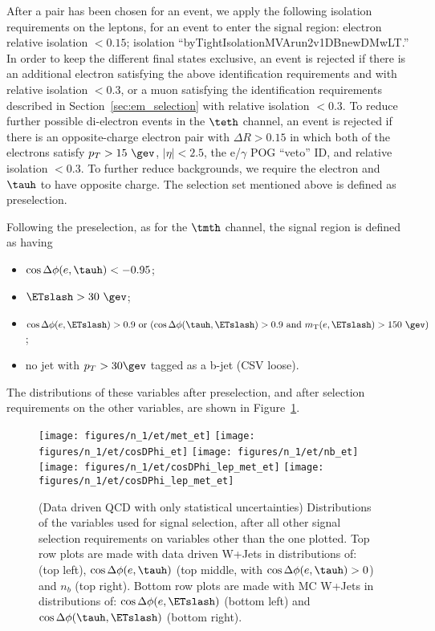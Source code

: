 After a pair has been chosen for an event, we apply the following
isolation requirements on the leptons, for an event to enter the
signal region: electron relative isolation $<0.15$; \tauh isolation
``byTightIsolationMVArun2v1DBnewDMwLT.''  In order to keep the
different final states exclusive, an event is rejected if there is an
additional electron satisfying the above identification requirements
and with relative isolation $<0.3$, or a muon satisfying the
identification requirements described in
Section~\ref{sec:em_selection} with relative isolation $<0.3$.  To
reduce further possible di-electron events in the $\teth$ channel, an
event is rejected if there is an opposite-charge electron pair with
$\Delta R > 0.15$ in which both of the electrons satisfy $p_T >
15~\gev$, $\vert \eta \vert < 2.5$, the e/$\gamma$ POG ``veto'' ID,
and relative isolation $<0.3$. To further reduce backgrounds, we require 
the electron and $\tauh$ to have opposite charge. The selection set 
mentioned above is defined as preselection.

Following the preselection, as for the $\tmth$ channel, the signal 
region is defined as having
\begin{itemize}
  \item $\cos{\Delta \phi (e,\tauh)}<-0.95$;
  \item $\ETslash>30~\gev$;
  \item $\cos{\Delta \phi (e,\ETslash)} > 0.9~\text{or}~(\cos{\Delta \phi (\tauh,\ETslash)} > 0.9~\text{and}~m_{\text{T}}(e,\ETslash) > 150~\gev)$;
  \item no jet with $p_T>30\gev$ tagged as a b-jet (CSV loose).
\end{itemize}

The distributions of these variables after preselection, and after
selection requirements on the other variables, are shown in
Figure~\ref{fig:et_nm1_distributions}.
\begin{figure}\centering
  \texttt{[image: figures/n\_1/et/met\_et]}
  \texttt{[image: figures/n\_1/et/cosDPhi\_et]}
  \texttt{[image: figures/n\_1/et/nb\_et]}
  \texttt{[image: figures/n\_1/et/cosDPhi\_lep\_met\_et]}
  \texttt{[image: figures/n\_1/et/cosDPhi\_lep\_met\_et]}

  \caption{\label{fig:et_nm1_distributions} (Data driven QCD with only statistical uncertainties) 
Distributions of the variables used for \teth signal selection, after all other signal selection requirements 
on variables other than the one plotted. Top row plots are made with data driven W+Jets in distributions of: 
\ETslash (top left), $\cos{\Delta \phi (e, \tauh)}$ (top middle, with $\cos{\Delta \phi (e, \tauh)} > 0$) 
and $n_b$ (top right). Bottom row plots are made with MC W+Jets in distributions of: 
$\cos{\Delta \phi (e, \ETslash)}$ (bottom left) and $\cos{\Delta \phi (\tauh, \ETslash)}$ (bottom right).}
\end{figure}

